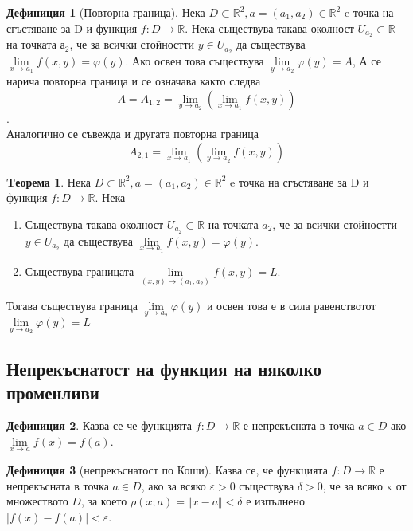 \documentclass[a4paper,fleqn,12pt]{article}
\theoremstyle{definition}
\newtheorem{theorem}{Tеорема}[subsection]
\newtheorem{definition}{Дефиниция}[subsection]
\begin{document}
\begin{definition}[Повторна граница]
Нека $D \subset \mathbb{R}^2, a = (a_1, a_2) \in \mathbb{R}^2$ e точка на сгъстяване за D и функция $f: D \to \mathbb{R}$. Нека съществува такава околност $U_{a_2} \subset \mathbb{R}$ на точката $а_2$, че за всички стойностти $y \in U_{a_2} $ да съществува  $\lim\limits_{x \to a_1} f(x,y) = \varphi (y)$. Ако освен това съществува $\lim\limits_{y \to a_2} \varphi (y) = A$, А се нарича повторна граница и се означава както следва 
$$A = A_{1,2} =\lim\limits_{y \to a_2} (\lim\limits_{x \to a_1} f(x,y) ) $$.\\
Аналогично се съвежда и другата повторна граница 
$$ A_{2,1} = \lim\limits_{x \to a_1} (\lim\limits_{y \to a_2} f(x,y) ) $$
\end{definition}

\begin{theorem}
Нека $D \subset \mathbb{R}^2, a = (a_1, a_2) \in \mathbb{R}^2$ e точка на сгъстяване за D и функция $f: D \to \mathbb{R}$.  Нека
\begin{enumerate}
		\item  Съществува такава околност $U_{a_2} \subset \mathbb{R}$ на точката $a_2$, че за всички стойностти $y \in U_{a_2} $ да съществува  $\lim\limits_{x \to a_1} f(x,y) = \varphi (y)$.

		\item Съществува границата $\lim\limits_{(x, y) \to (a_1,a_2) } f(x,y) = L$.
\end{enumerate}
Тогава съществува граница  $\lim\limits_{y \to a_2} \varphi (y)$ и освен това е в сила равенствотот  $\lim\limits_{y \to a_2} \varphi (y) = L$
\end{theorem}

\subsection{Непрекъснатост на функция на няколко променливи}

\begin{definition}
Казва се че функцията $f: D \to \mathbb{R}$ е непрекъсната в точка $a \in D$ ако $\lim\limits_{x \to a} f(x) = f(a)$.
\end{definition}

\begin{definition}[непрекъснатост по Коши]
Казва се, че функцията $f: D \to \mathbb{R}$ е непрекъсната в точка $a \in D$, ако за всяко $\varepsilon > 0$ съществува $\delta > 0$, че за всяко x от множеството $D $, за което $\rho(x;a) = \Vert x - a \Vert < \delta $ е изпълнено $\vert f(x) - f(a) \vert  < \varepsilon$.
\end{definition}
\end{document}
